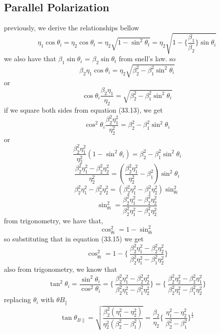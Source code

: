 \subsection{Parallel Polarization}
previously, we derive the relationships bellow
\begin{dmath}
\eta_1\cos\theta_i = \eta_2\cos\theta_t  = \eta_2\sqrt{1 - \sin^2\theta_t} = \eta_2\sqrt{1- \Bigg\{\dfrac{\beta_1}{\beta_2}\Bigg\}\sin\theta_i}
\end{dmath}
we also have that $\beta_1\sin\theta_i$ = $\beta_2\sin\theta_t$ from snell's law. so
\begin{equation*}
\beta_2\eta_1\cos\theta_i = \eta_2\sqrt{\beta_2^2-\beta_1^2\sin^2\theta_i}
\end{equation*}
or
\begin{equation}
\cos\theta_i\dfrac{\beta_2\eta_1}{\eta_2} = \sqrt{\beta_2^2-\beta_1^2\sin^2\theta_i}
\end{equation}
if we square both sides from equation (33.13), we get
\begin{equation*}
\cos^2\theta_i \dfrac{\beta^2_2\eta^2_1}{\eta^2_2} = \beta^2_2 - \beta^2_1\sin^2\theta_i
\end{equation*}
or
\begin{equation}
\dfrac{\beta^2_2\eta^2_1}{\eta^2_2}(1 - \sin^2\theta_i) = \beta^2_2 - \beta^2_1\sin^2\theta_i
\end{equation}
\begin{equation*}
\dfrac{\beta^2_2\eta^2_1 - \beta^2_2\eta^2_2}{\eta^2_2} = (\dfrac{\beta^2_2\eta^2_1}{\eta^2_2} - \beta^2_1)\sin^2\theta_i
\end{equation*}
\begin{equation*}
\beta^2_2\eta^2_1 - \beta^2_2\eta^2_2 = (\beta^2_2\eta^2_1 - \beta^2_1\eta^2_2)\sin^2_{\theta i}
\end{equation*}
\begin{equation}
\sin^2_{\theta i} = \dfrac{\beta^2_2\eta^2_1 - \beta^2_2\eta^2_2}{\beta^2_2\eta^2_1 - \beta^2_1\eta^2_2}
\end{equation}
from trigonometry, we have that,
\begin{equation*}
\cos^2_{\theta i} = 1 - \sin^2_{\theta i}
\end{equation*}
so substituting that in equation (33.15) we get 
\begin{equation}
\cos^2_{\theta i} = 1 - \Bigg\{\ \dfrac{\beta^2_2\eta^2_1 - \beta^2_2\eta^2_2}{\beta^2_2\eta^2_1 - \beta^2_1\eta^2_2} \Bigg\}
\end{equation}
also from trigonometry, we know that
\begin{equation*}
\tan^2\theta_i = \dfrac{\sin^2\theta_i}{\cos^2\theta_i} = \Bigg\{\ \dfrac{\beta^2_2\eta^2_1 - \beta^2_2\eta^2_2}{\beta^2_2\eta^2_1 - \beta^2_1\eta^2_2} \Bigg\} = \Bigg\{\ \dfrac{\beta^2_2\eta^2_2 - \beta^2_2\eta^2_1}{\beta^2_2\eta^2_1 - \beta^2_1\eta^2_2} \Bigg\}
\end{equation*}
replacing $\theta_i$ with $\theta B_\parallel$
\begin{equation}
\tan\theta_{B\parallel} = \sqrt{\dfrac{\beta^2_2(\eta^2_1 - \eta^2_2)}{\eta^2_2(\beta^2_2 - \beta^2_1)}} = \dfrac{\beta_2}{\eta_2}\Bigg\{\ \dfrac{\eta^2_1 - \eta^2_2}{\beta^2_2 - \beta^2_1} \Bigg\}^{\frac{1}{2}}
\end{equation}

